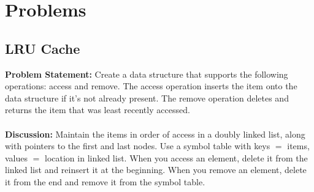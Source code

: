 \documentclass[10pt,a4paper,draft]{article}
\begin{document}
\section{Problems}
\subsection{LRU Cache}
\textbf{Problem Statement:} Create a data structure that supports the following operations: access and remove. The access operation inserts the item onto the data structure if it's not already present. The remove operation deletes and returns the item that was least recently accessed.
\\
\\
\textbf{Discussion:} Maintain the items in order of access in a doubly linked list, along with pointers to the first and last nodes. Use a symbol table with keys $=$ items, values $=$ location in linked list. When you access an element, delete it from the linked list and reinsert it at the beginning. When you remove an element, delete it from the end and remove it from the symbol table.
\end{document}
